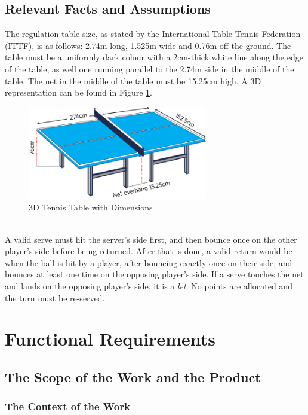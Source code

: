 \documentclass[11pt]{article}
\begin{document}
\subsection{Relevant Facts and Assumptions}
The regulation table size, as stated by the International Table Tennis Federation (ITTF), is as follows: 2.74m long, 1.525m wide and 0.76m off the ground. The table must be a uniformly dark colour with a 2cm-thick white line along the edge of the table, as well one running parallel to the 2.74m side in the middle of the table. The net in the middle of the table must be 15.25cm high. A 3D representation can be found in Figure \ref{fig:table-tennis-dim}.
\begin{figure}[htbp]
   \centering
   \includegraphics[width=0.7\textwidth]{../img/table-tennis-dim.png} %
   \caption{3D Tennis Table with Dimensions}
   \label{fig:table-tennis-dim}
\end{figure} \\
A valid serve must hit the server's side first, and then bounce once on the other player's side before being returned. After that is done, a valid return would be when the ball is hit by a player, after bouncing exactly once on their side, and bounces at least one time on the opposing player's side. If a serve touches the net and lands on the opposing player's side, it is a \textit{let}. No points are allocated and the turn must be re-served.
\section{Functional Requirements}

\subsection{The Scope of the Work and the Product}

\subsubsection{The Context of the Work}
\end{document}
